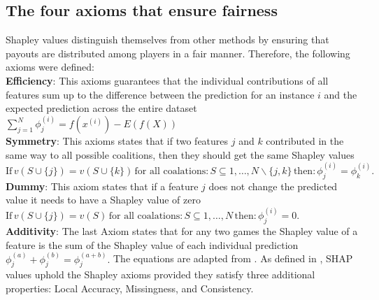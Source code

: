 \documentclass[12pt]{article}
\begin{document}
\subsection{The four axioms that ensure fairness}
\label{Thefouraxioms}
Shapley values distinguish themselves from other methods by ensuring that payouts are distributed among players in a fair manner. Therefore, the following axioms were defined:\\
\textbf{Efficiency}: This axioms guarantees that the individual contributions of all features sum up to the difference between the prediction for an instance $i$ and the expected prediction across the entire dataset
$\sum_{j=1}^{N} \phi^{(i)}_j = f(x^{(i)}) - E(f(X))$\\
\textbf{Symmetry}: This axioms states that if two features $j$ and $k$ contributed in the same way to all possible coalitions, then they should get the same Shapley values
$
	\text{If} \, v(S \cup \{j\})  = v(S \cup \{k\})\,
	\text{for all coalations:} \, {S \subseteq {1,\ldots,N}\backslash\{j,k\}}\,
	\text{then:} \,  \phi^{(i)}_j  = \phi^{(i)}_k.
$\\
\textbf{Dummy}: This axiom states that if a feature $j$ does not change the predicted value it needs to have a Shapley value of zero
$
\text{If} \, v(S \cup \{j\})  = v(S)\,
\text{for all coalations:} \, {S \subseteq {1,\ldots,N}}\,
\text{then:} \,  \phi^{(i)}_j  = 0.
$\\
\textbf{Additivity}: The last Axiom states that for any two games the Shapley value of a feature is the sum of the Shapley value of each individual prediction
$
	\phi^{(a)}_j + \phi^{(b)}_j = \phi^{(a+b)}_j.
$
The equations are adapted from \citet[Section~5.6.1]{molnarSHAP}. As defined in \citet{10.5555/3295222.3295230}, SHAP values uphold the Shapley axioms provided they satisfy three additional properties: Local Accuracy, Missingness, and Consistency.
\end{document}
